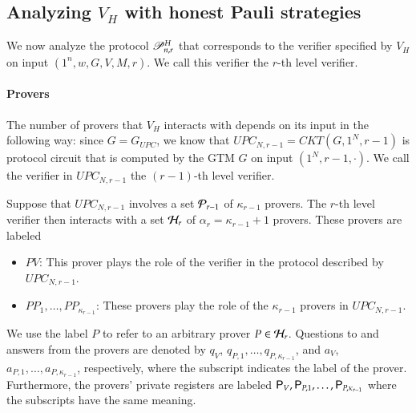 \subsection{Analyzing $V_H$ with honest Pauli strategies}

We now analyze the protocol $\mathscr{P}_{n,r}^H$ that corresponds to the verifier specified by $V_H$ on input $(1^n,w,G,V,M,r)$. We call this verifier the $r$-th level verifier. 

\paragraph{Provers}
The number of provers that $V_H$ interacts with depends on its input in the following way: since $G = G_{UPC}$, we know that $UPC_{N,r-1} = CKT(G,1^N,r-1)$ is protocol circuit that is computed by the GTM $G$ on input $(1^N,r-1,\cdot)$. We call the verifier in $UPC_{N,r-1}$ the $(r-1)$-th level verifier.

Suppose that $UPC_{N,r-1}$ involves a set $\mathcal P_{r-1}$ of $\kappa_{r-1}$ provers. The $r$-th level verifier then interacts with a set $\mathcal H_r$ of $\alpha_r = \kappa_{r-1} + 1$ provers. These provers are labeled
\begin{itemize}
	\item $PV$: This prover plays the role of the verifier in the protocol described by $UPC_{N,r-1}$. 
	\item $PP_1,\ldots,PP_{\kappa_{r-1}}$: These provers play the role of the $\kappa_{r-1}$ provers in $UPC_{N,r-1}$.
\end{itemize}
We use the label $P$ to refer to an arbitrary prover $P\in\mathcal H_r$. Questions to and answers from the provers are denoted  by $q_V$, $q_{P,1},\ldots,q_{P,\kappa_{r-1}}$, and $a_V$, $a_{P,1},\ldots,a_{P,\kappa_{r-1}}$, respectively, where the subscript indicates the label of the prover. Furthermore, the provers' private registers are labeled ${\mathsf{P}}_V, {\mathsf{P}}_{P,1},\ldots,{\mathsf{P}}_{P,\kappa_{r-1}}$ where the subscripts have the same meaning.



